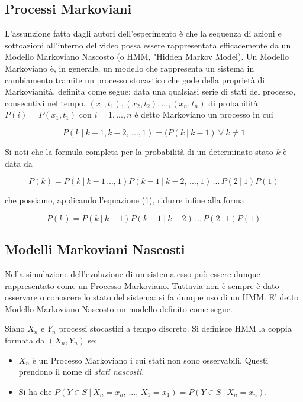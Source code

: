 \documentclass[10pt,letterpaper]{article}
\begin{document}
\subsection{Processi Markoviani}
L'assunzione fatta dagli autori dell'esperimento è che la sequenza di azioni e sottoazioni all'interno del video possa essere rappresentata efficacemente da un Modello Markoviano Nascosto (o HMM, "Hidden Markov Model). Un Modello Markoviano è, in generale, un modello che rappresenta un sistema in cambiamento tramite un processo stocastico che gode della proprietà di Markovianità, definita come segue: data una qualsiasi serie di stati del processo, consecutivi nel tempo, $(x_1,t_1), (x_2,t_2), ..., (x_n, t_n)$ di probabilità $P(i) =  P(x_1,t_1)$ con $i = 1, ..., n$ è detto Markoviano un processo in cui 

\begin{equation}
P(k\:|\:k-1, k-2,\,..., 1) = (P(k\:|\:k-1)\: \forall \: k \neq 1
\end{equation}

Si noti che la formula completa per la probabilità di un determinato stato $k$ è data da 

\begin{equation}
P(k) = P(k\:|\:k-1\, ..., 1)P(k-1\:|\:k-2,\,...,1)\,...\,P(2\:|\:1)P(1)
\end{equation}

 che possiamo, applicando l'equazione (1), ridurre infine alla forma

\begin{equation}
P(k) = P(k\:|\:k-1)P(k-1\:|\:k-2)\,...\,P(2\:|\:1)P(1)
\end{equation}

\subsection{Modelli Markoviani Nascosti}
Nella simulazione dell'evoluzione di un sistema esso può essere dunque rappresentato come un Processo Markoviano. Tuttavia non è sempre è dato osservare o conoscere lo stato del sistema: si fa dunque uso di un HMM. E' detto Modello Markoviano Nascosto un modello definito come segue.

Siano $X_n$ e $Y_n$ processi stocastici a tempo discreto. Si definisce HMM la coppia formata da $(X_n, Y_n)$ se:

\begin{itemize}
\item $X_n$ è un Processo Markoviano i cui stati non sono osservabili. Questi prendono il nome di \textit{stati nascosti}.
\item Si ha che $P(Y \in S\:|\:X_n = x_n,\,...,\,X_1 = x_1) = P(Y \in S\:|\:X_n = x_n)$.
\end{itemize}
\end{document}
